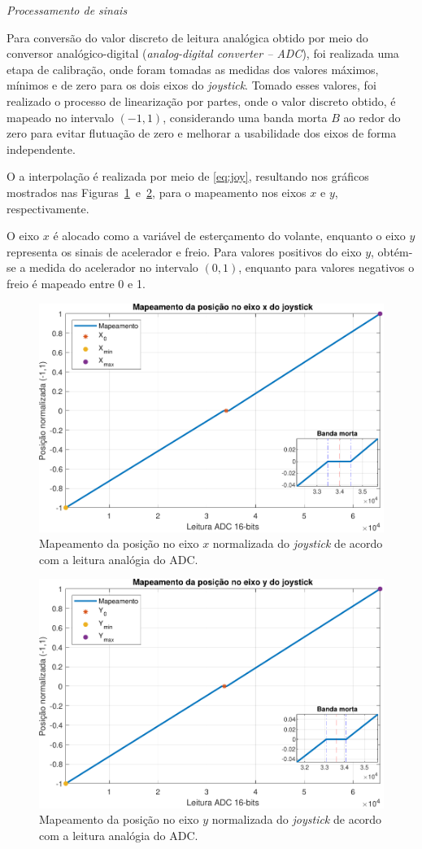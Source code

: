 \noindent \textit{Processamento de sinais}

Para conversão do valor discreto de leitura analógica obtido por meio do conversor analógico-digital (\textit{analog-digital converter -- ADC}), foi realizada uma etapa de calibração, onde foram tomadas as medidas dos valores máximos, mínimos e de zero para os dois eixos do \textit{joystick}. Tomado esses valores, foi realizado o processo de linearização por partes, onde o valor discreto obtido, é mapeado no intervalo $(-1, 1)$, considerando uma banda morta $B$ ao redor do zero para evitar flutuação de zero e melhorar a usabilidade dos eixos de forma independente.

O a interpolação é realizada por meio de \eqref{eq:joy}, resultando nos gráficos mostrados nas Figuras~\ref{fig:plotjoyxaxis}~e~\ref{fig:plotjoyyaxis}, para o mapeamento nos eixos $x$ e $y$, respectivamente.

O eixo $x$ é alocado como a variável de esterçamento do volante, enquanto o eixo $y$ representa os sinais de acelerador e freio. Para valores positivos do eixo $y$, obtém-se a medida do acelerador no intervalo $(0,1)$, enquanto para valores negativos o freio é mapeado entre 0 e 1.

\begin{figure}
	\centering
	\includegraphics[width=0.75\linewidth]{img/plot_joy_x_axis.pdf}
	\caption{Mapeamento da posição no eixo $x$ normalizada do \textit{joystick} de acordo com a leitura analógia do ADC.}
	\label{fig:plotjoyxaxis}
\end{figure}

\begin{figure}
\centering
\includegraphics[width=0.75\linewidth]{img/plot_joy_y_axis.pdf}
\caption{Mapeamento da posição no eixo $y$ normalizada do \textit{joystick} de acordo com a leitura analógia do ADC.}
\label{fig:plotjoyyaxis}
\end{figure}

